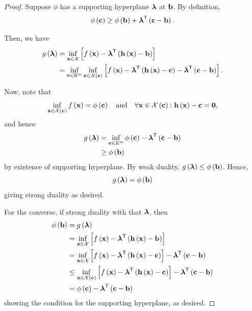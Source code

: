 \documentclass[11pt]{article}
\theoremstyle{definition}
\theoremstyle{remark}
\newcommand{\pqty}[1]{\left(#1\right)}
\newcommand{\bqty}[1]{\left[#1\right]}
\newcommand{\RR}{\mathbb{R}}
\newcommand{\transpose}{^{\mathsf{T}}}
\newcommand{\qand}{\quad\text{and}\quad}
\begin{document}
\begin{proof}
    Suppose \(\phi\) has a supporting hyperplane \(\vb*{\lambda}\) at \(\vb{b}\). By definition,
    \[
        \phi\pqty{\vb{c}} \geq \phi\pqty{\vb{b}} + \vb*{\lambda}\transpose \pqty{\vb{c} - \vb{b}}.
    \]

    Then, we have
    \begin{align*}
        g\pqty{\vb*{\lambda}} &= \inf_{\vb{x} \in \mathcal{X}} \bqty{f\pqty{\vb{x}} - \vb*{\lambda}\transpose \pqty{\vb{h}\pqty{\vb{x}} - \vb{b}}} \\
        &= \inf_{\vb{c} \in \RR^m} \inf_{\vb{x} \in \mathcal{X}\pqty{\vb{c}}} \bqty{f\pqty{\vb{x}} - \vb*{\lambda}\transpose \pqty{\vb{h}\pqty{\vb{x}} - \vb{c}} - \vb*{\lambda}\transpose \pqty{\vb{c} - \vb{b}}}.
    \end{align*}

    Now, note that
    \[
        \inf_{\vb{x} \in \mathcal{X} \pqty{\vb{c}}} f\pqty{\vb{x}} = \phi\pqty{\vb{c}} \qand \forall \vb{x} \in \mathcal{X}\pqty{\vb{c}}: \vb{h}\pqty{\vb{x}} - \vb{c} = \vb{0},
    \]
    and hence
    \begin{align*}
         g\pqty{\vb*{\lambda}} &= \inf_{\vb{c} \in \RR^m} \phi\pqty{\vb{c}} - \vb*{\lambda}\transpose \pqty{\vb{c} - \vb{b}} \\
         &\geq \phi\pqty{\vb{b}}
    \end{align*}
    by existence of supporting hyperplane. By weak duality, \(g\pqty{\vb*{\lambda}} \leq \phi\pqty{\vb{b}}\). Hence,
    \[
        g\pqty{\vb*{\lambda}} = \phi\pqty{\vb{b}}
    \]
    giving strong duality as desired.

    For the converse, if strong duality with that \(\vb*{\lambda}\), then
    \begin{align*}
        \phi\pqty{\vb{b}} &= g\pqty{\vb*{\lambda}} \\
        &= \inf_{\vb{x} \in \mathcal{X}} \bqty{f\pqty{\vb{x}} - \vb*{\lambda}\transpose \pqty{\vb{h}\pqty{\vb{x}} - \vb{b}}} \\
        &= \inf_{\vb{x} \in \mathcal{X}} \bqty{f\pqty{\vb{x}} - \vb*{\lambda}\transpose \pqty{\vb{h}\pqty{\vb{x}} - \vb{c}}} - \vb*{\lambda}\transpose \pqty{\vb{c} - \vb{b}} \\
        &\leq \inf_{\vb{x} \in \mathcal{X}\pqty{\vb{c}}} \bqty{f\pqty{\vb{x}} - \vb*{\lambda}\transpose \pqty{\vb{h}\pqty{\vb{x}} - \vb{c}}} - \vb*{\lambda}\transpose \pqty{\vb{c} - \vb{b}} \\
        &= \phi\pqty{\vb{c}} - \vb*{\lambda}\transpose \pqty{\vb{c} - \vb{b}}
    \end{align*}
    showing the condition for the supporting hyperplane, as desired.
\end{proof}
\end{document}

